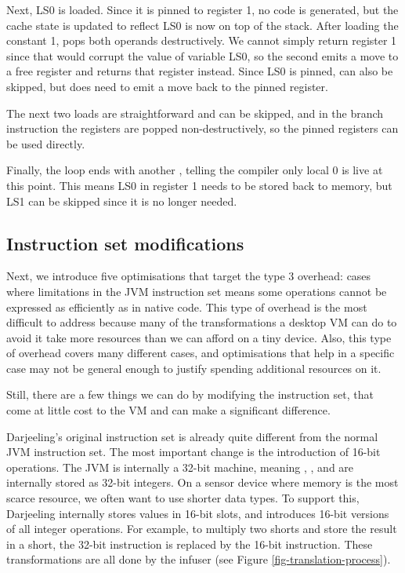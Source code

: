 Next, LS0 is loaded. Since it is pinned to register 1, no code is generated, but the cache state is updated to reflect LS0 is now on top of the stack. After loading the constant 1,  pops both operands destructively. We cannot simply return register 1 since that would corrupt the value of variable LS0, so the second  emits a move to a free register and returns that register instead. Since LS0 is pinned,  can also be skipped, but  does need to emit a move back to the pinned register.

The next two loads are straightforward and can be skipped, and in the branch instruction the registers are popped non-destructively, so the pinned registers can be used directly.

Finally, the loop ends with another , telling the compiler only local 0 is live at this point. This means LS0 in register 1 needs to be stored back to memory, but LS1 can be skipped since it is no longer needed.

\subsection{Instruction set modifications}
Next, we introduce five optimisations that target the type 3 overhead: cases where limitations in the JVM instruction set means some operations cannot be expressed as efficiently as in native code. This type of overhead is the most difficult to address because many of the transformations a desktop VM can do to avoid it take more resources than we can afford on a tiny device. Also, this type of overhead covers many different cases, and optimisations that help in a specific case may not be general enough to justify spending additional resources on it.

Still, there are a few things we can do by modifying the instruction set, that come at little cost to the VM and can make a significant difference.

Darjeeling's original instruction set is already quite different from the normal JVM instruction set. The most important change is the introduction of 16-bit operations. The JVM is internally a 32-bit machine, meaning , , and  are internally stored as 32-bit integers. On a sensor device where memory is the most scarce resource, we often want to use shorter data types. To support this, Darjeeling internally stores values in 16-bit slots, and introduces 16-bit versions of all integer operations. For example, to multiply two shorts and store the result in a short, the 32-bit  instruction is replaced by the 16-bit  instruction. These transformations are all done by the infuser (see Figure \ref{fig-translation-process}).

